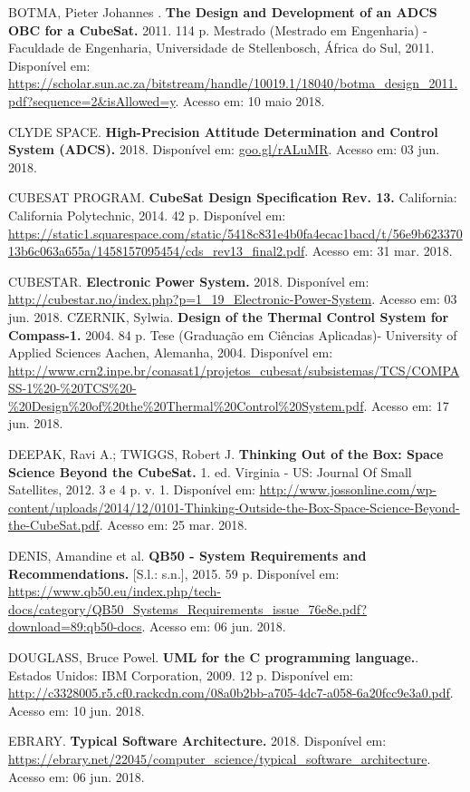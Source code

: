 \noindent BOTMA, Pieter Johannes . \textbf{The Design and Development of an ADCS OBC for a CubeSat. } 2011. 114 p. Mestrado (Mestrado em Engenharia) - Faculdade de Engenharia, Universidade de Stellenbosch, África do Sul, 2011. Disponível em: \url{https://scholar.sun.ac.za/bitstream/handle/10019.1/18040/botma_design_2011.pdf?sequence=2&isAllowed=y}. Acesso em: 10 maio 2018.

\noindent CLYDE SPACE. \textbf{High-Precision Attitude Determination and Control System (ADCS). } 2018. Disponível em: \url{goo.gl/rALuMR}. Acesso em: 03 jun. 2018.

\noindent CUBESAT PROGRAM. \textbf{CubeSat Design Specification Rev. 13. } California: California Polytechnic, 2014. 42 p. Disponível em: \url{https://static1.squarespace.com/static/5418c831e4b0fa4ecac1bacd/t/56e9b62337013b6c063a655a/1458157095454/cds_rev13_final2.pdf}. Acesso em: 31 mar. 2018.

\noindent CUBESTAR. \textbf{Electronic Power System. } 2018. Disponível em: \url{http://cubestar.no/index.php?p=1_19_Electronic-Power-System}. Acesso em: 03 jun. 2018.
\noindent CZERNIK, Sylwia. \textbf{Design of the Thermal Control System for Compass-1. } 2004. 84 p. Tese (Graduação em Ciências Aplicadas)- University of Applied Sciences Aachen, Alemanha, 2004. Disponível em: \url{http://www.crn2.inpe.br/conasat1/projetos_cubesat/subsistemas/TCS/COMPASS-1\%20-\%20TCS\%20-\%20Design\%20of\%20the\%20Thermal\%20Control\%20System.pdf}. Acesso em: 17 jun. 2018.

\noindent DEEPAK, Ravi A.; TWIGGS, Robert J. \textbf{Thinking Out of the Box: Space Science Beyond the CubeSat. } 1. ed. Virginia - US: Journal Of Small Satellites, 2012. 3 e 4 p. v. 1. Disponível em: \url{http://www.jossonline.com/wp-content/uploads/2014/12/0101-Thinking-Outside-the-Box-Space-Science-Beyond-the-CubeSat.pdf}. Acesso em: 25 mar. 2018.

\noindent DENIS, Amandine et al. \textbf{QB50 - System Requirements and Recommendations.} [S.l.: s.n.], 2015. 59 p. Disponível em: \url{ https://www.qb50.eu/index.php/tech-docs/category/QB50_Systems_Requirements_issue_76e8e.pdf?download=89:qb50-docs}. Acesso em: 06 jun. 2018.

\noindent DOUGLASS, Bruce Powel. \textbf{UML for the C programming language.}. Estados Unidos: IBM Corporation, 2009. 12 p. Disponível em: \url{http://c3328005.r5.cf0.rackcdn.com/08a0b2bb-a705-4dc7-a058-6a20fcc9e3a0.pdf}. Acesso em: 10 jun. 2018.

\noindent EBRARY. \textbf{Typical Software Architecture.} 2018. Disponível em: \url{https://ebrary.net/22045/computer_science/typical_software_architecture}. Acesso em: 06 jun. 2018.

